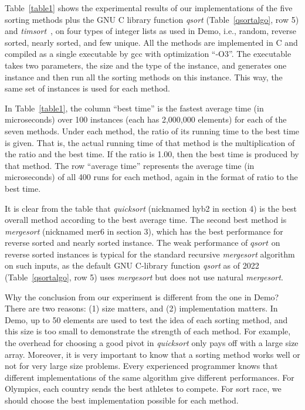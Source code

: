\documentclass[AMA,STIX1COL]{WileyNJD-v2}
\newcommand{\qusort}{\emph{quicksort }}
\newcommand{\qsort}{\emph{qsort }}
\newcommand{\tsortn}{\emph{timsort}}
\newcommand{\msort}{\emph{mergesort }}
\begin{document}
Table~\ref{table1} shows the experimental results of our implementations of the five sorting methods plus the GNU C library function \qsort (Table~\ref{qsortalgo}, row 5) and \tsortn~\cite{timsort}, on four types of integer lists as used in Demo, i.e., random, reverse sorted, nearly sorted, and few unique. 
All the methods are implemented in C and compiled as a single executable by gcc with optimization “-O3”. 
The executable takes two parameters, the size and the type of the instance, and generates one instance and then run all the sorting methods on this instance. 
This way, the same set of instances is used for each method.

In Table~\ref{table1}, the column “best time” is the fastest average time (in microseconds) over 100 instances (each has 2,000,000 elements) for each of the seven methods.  
Under each method, the ratio of its running time to the best time is given. 
That is, the actual running time of that method is the multiplication of the ratio and the best time. 
If the ratio is 1.00, then the best time is produced by that method. 
The row “average time” represents the average time (in microseconds) of all 400 runs for each method, again in the format of ratio to the best time.

It is clear from the table that \qusort (nicknamed hyb2 in section 4) is the best overall method according to the best average time. 
The second best method is \msort (nicknamed mer6 in section 3), which has the best performance for reverse sorted and nearly sorted instance. 
The weak performance of $qsort$ on reverse sorted instances is typical for the standard recursive \msort algorithm on such inputs, as the default GNU C-library function \qsort as of 2022 (Table~\ref{qsortalgo}, row 5) uses \emph{mergesort} but does not use natural \emph{mergesort}.


Why the conclusion from our experiment is different from the one in Demo? 
There are two reasons: (1) size matters, and (2) implementation matters. 
In Demo, up to 50 elements are used to test the idea of each sorting method, and this size is too small to demonstrate the strength of each method. 
For example, the overhead for choosing a good pivot in \qusort only pays off with a large size array. 
Moreover, it is very important to know that a sorting method works well or not for very large size problems. 
Every experienced programmer knows that different implementations of the same algorithm give different performances. 
For Olympics, each country sends the best athletes to compete. 
For sort race, we should choose the best implementation possible for each method.
\end{document}

